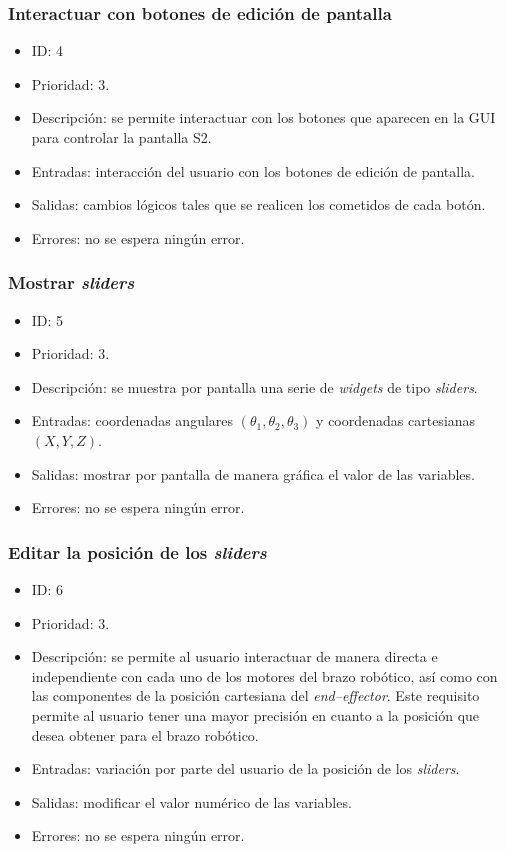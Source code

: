 \subsubsection{Interactuar con botones de edición de pantalla}
\begin{itemize}
    \item ID: 4
    \item Prioridad: 3.
    \item Descripción: se permite interactuar con los botones que aparecen en la \ac{GUI} para controlar la pantalla \ac{S2}.
    \item Entradas: interacción del usuario con los botones de edición de pantalla.
    \item Salidas: cambios lógicos tales que se realicen los cometidos de cada botón.
    \item Errores: no se espera ningún error.
\end{itemize}

\subsubsection{Mostrar \textit{sliders}}
\begin{itemize}
    \item ID: 5
    \item Prioridad: 3.
    \item Descripción: se muestra por pantalla una serie de \textit{widgets} de tipo \textit{sliders}.  
    \item Entradas: coordenadas angulares $\left(\theta_1, \theta_2, \theta_3\right)$ y coordenadas cartesianas $\left(X,Y,Z\right)$.
    \item Salidas: mostrar por pantalla de manera gráfica el valor de las variables.
    \item Errores: no se espera ningún error.
\end{itemize}

\subsubsection{Editar la posición de los \textit{sliders}}
\begin{itemize}
    \item ID: 6
    \item Prioridad: 3.
    \item Descripción: se permite al usuario interactuar de manera directa e independiente con cada uno de los motores del brazo robótico, así como con las componentes de la posición cartesiana del \textit{end--effector}. Este requisito permite al usuario tener una mayor precisión en cuanto a la posición que desea obtener para el brazo robótico.
    \item Entradas: variación por parte del usuario de la posición de los \textit{sliders}.
    \item Salidas: modificar el valor numérico de las variables.
    \item Errores: no se espera ningún error.
\end{itemize}

